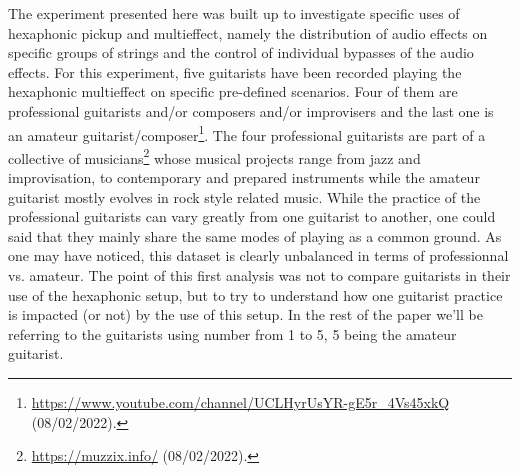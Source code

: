 \documentclass{article}
\begin{document}
The experiment presented here was built up to investigate specific uses of hexaphonic pickup and multieffect, name\-ly the distribution of audio effects on specific groups of strings and the control of individual bypasses of the audio effects. 
For this experiment, five guitarists have been recorded playing the hexaphonic multieffect on specific pre-defined scenarios. Four of them are professional guitarists and/or composers and/or improvisers and the last one is an amateur guitarist/composer\footnote{\url{https://www.youtube.com/channel/UCLHyrUsYR-gE5r\_4Vs45xkQ} (08/02/2022).}. The four professional guitarists are part of a collective of musicians\footnote{\url{https://muzzix.info/} (08/02/2022).} whose musical pro\-jects range from jazz and improvisation, to contemporary and prepared instruments while the amateur guitarist mostly evolves in rock style related music. While the practice of the professional guitarists can vary greatly from one guitarist to another, one could said that they mainly share the same modes of playing as a common ground. As one may have noticed, this dataset is clearly unbalanced in terms of professionnal vs. amateur. The point of this first analysis was not to compare guitarists in their use of the hexaphonic setup, but to try to understand how one guitarist practice is impacted (or not) by the use of this setup. In the rest of the paper we'll be referring to the guitarists using number from 1 to 5, 5 being the amateur guitarist. 
\end{document}

